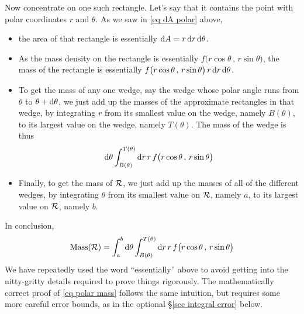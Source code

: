 \begin{eg}[Mass]
Now concentrate on one such rectangle. Let's say that it contains the point 
with polar coordinates $r$ and $\theta$. As we saw in \eqref{eq dA polar} above, 
\begin{itemize}
\item 
the area of that rectangle is essentially $\mathrm{d}A =  r\,\mathrm{d}r\,\mathrm{d}\theta$.
\item
As the mass density on the rectangle is essentially 
           $f\big(r\cos\theta\,,\,r\sin\theta\big)$, 
the mass of the rectangle is essentially 
         $f\big(r\cos\theta\,,\,r\sin\theta\big)\,r\,\mathrm{d}r\,\mathrm{d}\theta$.
\item 
To get the mass of any one wedge,  say the wedge whose polar angle 
runs from $\theta$ to $\theta+\mathrm{d}\theta$, we just add up the masses of the
approximate rectangles in that wedge, by integrating $r$ from its 
smallest value on the wedge, namely $B(\theta)$, to its largest value 
on the wedge, namely $T(\theta)$. The mass of the wedge is thus
\begin{equation*}
\mathrm{d}\theta \int_{B(\theta)}^{T(\theta)}  \mathrm{d}r\,r\,
       f\big(r\cos\theta\,,\,r\sin\theta\big)
\end{equation*}
\item 
Finally, to get the mass of $\mathcal{R}$, we just add up the masses of all of the
different wedges, by integrating $\theta$ from its smallest value on $\mathcal{R}$,
namely $a$, to its largest value on $\mathcal{R}$, namely $b$.
\end{itemize}
In conclusion, 
\begin{equation*}
\text{Mass}(\mathcal{R}) = \int_a^b  \mathrm{d}\theta 
             \int_{B(\theta)}^{T(\theta)}  \mathrm{d}r\,r\,
                   f\big(r\cos\theta\,,\,r\sin\theta\big)
\end{equation*}
We have repeatedly used the word ``essentially'' above to avoid getting
into the nitty-gritty details required to prove things rigorously.
The mathematically correct proof of \eqref{eq polar mass} follows
the same intuition, but requires some more careful error bounds,
as in the optional \S\ref{sec integral error} below.
\end{eg}

